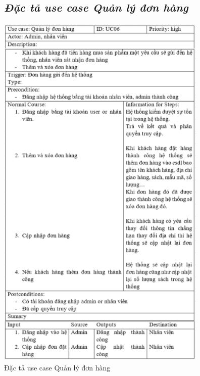 \documentclass{report}
\begin{document}
\begin{figure}[htp]
    \subsection{\textit{Đặc tả use case Quản lý đơn hàng}}
    \centering
    \includegraphics[scale = 1.3]{image/UC06.PNG}
    \caption{Đặc tả use case Quản lý đơn hàng}
\end{figure}

\pagebreak
\end{document}

